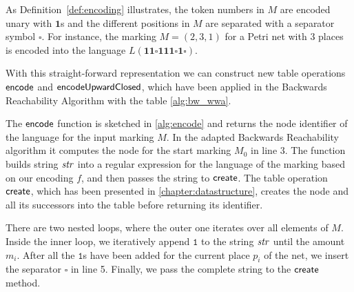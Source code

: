 As Definition~\autoref{def:encoding} illustrates, the token numbers in $M$ are encoded unary with $\bm{1}$s and the different positions in $M$ are separated with a separator symbol $\square$. For instance, the marking $M = (2,3,1)$ for a Petri net with 3 places is encoded into the language $L(\bm{11 \square 111 \square 1 \square})$. 
\par 
With this straight-forward representation we can construct new table operations $\operatorname{\textsf{encode}}$ and $\operatorname{\textsf{encodeUpwardClosed}}$, which have been applied in the Backwards Reachability Algorithm with the table \autoref{alg:bw_wwa}. 
\par
The $\operatorname{\textsf{encode}}$ function is sketched in \autoref{alg:encode} and returns the node identifier of the language for the input marking $M$. In the adapted Backwards Reachability algorithm it computes the node for the start marking $M_{0}$ in line 3. The function builds string $\mathit{str}$ into a regular expression for the language of the marking based on our encoding $f$, and then passes the string to $\operatorname{\textsf{create}}$. The table operation $\operatorname{\textsf{create}}$, which has been presented in \autoref{chapter:datastructure}, creates the node and all its successors into the table before returning its identifier.

\par
There are two nested loops, where the outer one iterates over all elements of $M$. Inside the inner loop, we iteratively append $\texttt{1}$ to the string $\mathit{str}$ until the amount $m_{i}$. After all the $\texttt{1}$s have been added for the current place $p_{i}$ of the net, we insert the separator $\square$ in line 5.
Finally, we pass the complete string to the $\operatorname{\textsf{create}}$ method. 

